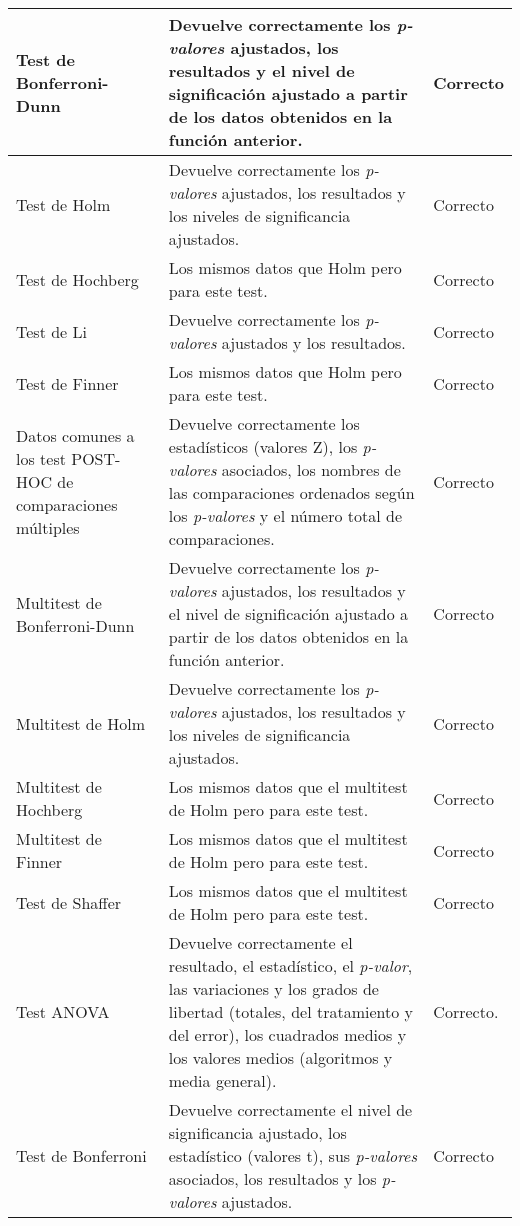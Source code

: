 \begin{center}
\begin{longtable}[H]{| p{3cm}| p{7cm} | p{3cm} |}
	Test de Bonferroni-Dunn & Devuelve correctamente los \textit{p-valores} ajustados, los resultados y el nivel de significación ajustado a partir de los datos obtenidos en la función anterior. & Correcto \\ \hline
	Test de Holm & Devuelve correctamente los \textit{p-valores} ajustados, los resultados y los niveles de significancia ajustados. & Correcto \\ \hline
	Test de Hochberg & Los mismos datos que Holm pero para este test. & Correcto \\ \hline
	Test de Li & Devuelve correctamente los \textit{p-valores} ajustados y los resultados. & Correcto \\ \hline
	Test de Finner & Los mismos datos que Holm pero para este test. & Correcto \\ \hline
	Datos comunes a los test POST-HOC de comparaciones múltiples & Devuelve correctamente los estadísticos (valores Z), los \textit{p-valores} asociados, los nombres de las comparaciones ordenados según los \textit{p-valores} y el número total de comparaciones. & Correcto \\ \hline
	Multitest de Bonferroni-Dunn & Devuelve correctamente los \textit{p-valores} ajustados, los resultados y el nivel de significación ajustado a partir de los datos obtenidos en la función anterior. & Correcto \\ \hline
	Multitest de Holm & Devuelve correctamente los \textit{p-valores} ajustados, los resultados y los niveles de significancia ajustados. & Correcto \\ \hline
	Multitest de Hochberg & Los mismos datos que el multitest de Holm pero para este test. & Correcto \\ \hline
	Multitest de Finner & Los mismos datos que el multitest de Holm pero para este test. & Correcto \\ \hline
	Test de Shaffer & Los mismos datos que el multitest de Holm pero para este test. & Correcto \\ \hline
	Test ANOVA & Devuelve correctamente el resultado, el estadístico, el \textit{p-valor}, las variaciones y los grados de libertad (totales, del tratamiento y del error), los cuadrados medios y los valores medios (algoritmos y media general). & Correcto. \\ \hline
	Test de Bonferroni & Devuelve correctamente el nivel de significancia ajustado, los estadístico (valores t), sus \textit{p-valores} asociados, los resultados y los \textit{p-valores} ajustados. & Correcto \\ \hline
\end{longtable}
\end{center}

